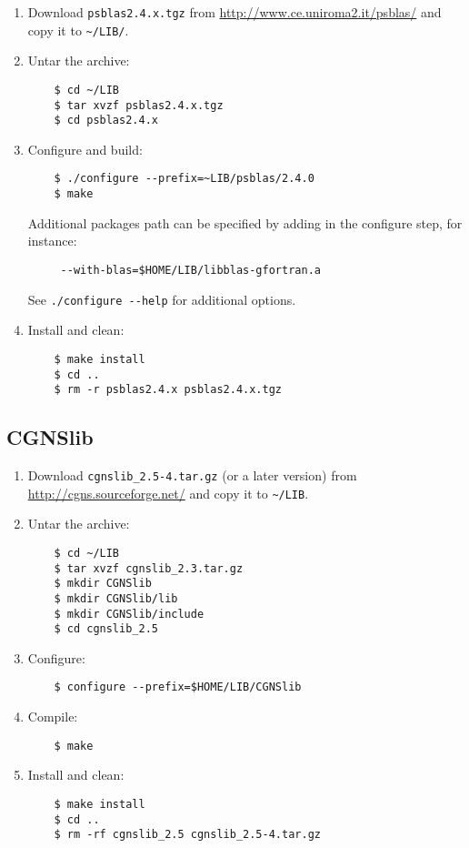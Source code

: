 \documentclass[a4paper,12pt]{article}%
\begin{document}
\begin{enumerate}
\item Download \verb+psblas2.4.x.tgz+ from
  \url{http://www.ce.uniroma2.it/psblas/} and copy it to
  \verb+~/LIB/+.
\item Untar the archive:
  \begin{Verbatim}
    $ cd ~/LIB
    $ tar xvzf psblas2.4.x.tgz
    $ cd psblas2.4.x
  \end{Verbatim}
\item Configure and build:
  \begin{Verbatim}
    $ ./configure --prefix=~LIB/psblas/2.4.0  
    $ make
  \end{Verbatim}
Additional packages path can be specified by adding in the configure step, for
instance:
\begin{Verbatim}
     --with-blas=$HOME/LIB/libblas-gfortran.a
\end{Verbatim}
See \verb+./configure --help+ for additional options.
\item Install and clean:
  \begin{Verbatim}
    $ make install 
    $ cd ..
    $ rm -r psblas2.4.x psblas2.4.x.tgz
  \end{Verbatim}
\end{enumerate}


\subsection{CGNSlib}

\begin{enumerate}
\item Download \verb+cgnslib_2.5-4.tar.gz+ (or a later version) from
  \url{http://cgns.sourceforge.net/} and copy it to \verb+~/LIB+.
\item Untar the archive:
  \begin{Verbatim}
    $ cd ~/LIB
    $ tar xvzf cgnslib_2.3.tar.gz
    $ mkdir CGNSlib
    $ mkdir CGNSlib/lib
    $ mkdir CGNSlib/include
    $ cd cgnslib_2.5
  \end{Verbatim}
\item Configure:
  \begin{Verbatim}
    $ configure --prefix=$HOME/LIB/CGNSlib
  \end{Verbatim}
\item Compile:
  \begin{Verbatim}
    $ make
  \end{Verbatim}
\item Install and clean:
  \begin{Verbatim}
    $ make install
    $ cd ..
    $ rm -rf cgnslib_2.5 cgnslib_2.5-4.tar.gz
  \end{Verbatim}
\end{enumerate}
\end{document}
